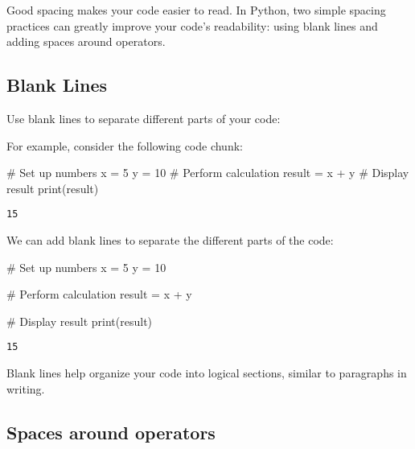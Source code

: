 \documentclass[
  letterpaper,
  DIV=11,
  numbers=noendperiod]{scrreprt}
\newenvironment{Shaded}{\begin{snugshade}}{\end{snugshade}}
\newcommand{\BuiltInTok}[1]{\textcolor[rgb]{0.00,0.23,0.31}{#1}}
\newcommand{\CommentTok}[1]{\textcolor[rgb]{0.37,0.37,0.37}{#1}}
\newcommand{\DecValTok}[1]{\textcolor[rgb]{0.68,0.00,0.00}{#1}}
\newcommand{\NormalTok}[1]{\textcolor[rgb]{0.00,0.23,0.31}{#1}}
\newcommand{\OperatorTok}[1]{\textcolor[rgb]{0.37,0.37,0.37}{#1}}
\begin{document}
Good spacing makes your code easier to read. In Python, two simple
spacing practices can greatly improve your code's readability: using
blank lines and adding spaces around operators.

\subsection{Blank Lines}\label{blank-lines}

Use blank lines to separate different parts of your code:

For example, consider the following code chunk:

\begin{Shaded}
\begin{Highlighting}[]
\CommentTok{\# Set up numbers}
\NormalTok{x }\OperatorTok{=} \DecValTok{5}
\NormalTok{y }\OperatorTok{=} \DecValTok{10}
\CommentTok{\# Perform calculation}
\NormalTok{result }\OperatorTok{=}\NormalTok{ x }\OperatorTok{+}\NormalTok{ y}
\CommentTok{\# Display result}
\BuiltInTok{print}\NormalTok{(result)}
\end{Highlighting}
\end{Shaded}

\begin{verbatim}
15
\end{verbatim}

We can add blank lines to separate the different parts of the code:

\begin{Shaded}
\begin{Highlighting}[]
\CommentTok{\# Set up numbers}
\NormalTok{x }\OperatorTok{=} \DecValTok{5}
\NormalTok{y }\OperatorTok{=} \DecValTok{10}

\CommentTok{\# Perform calculation}
\NormalTok{result }\OperatorTok{=}\NormalTok{ x }\OperatorTok{+}\NormalTok{ y}

\CommentTok{\# Display result}
\BuiltInTok{print}\NormalTok{(result)}
\end{Highlighting}
\end{Shaded}

\begin{verbatim}
15
\end{verbatim}

Blank lines help organize your code into logical sections, similar to
paragraphs in writing.

\subsection{Spaces around operators}\label{spaces-around-operators}
\end{document}
